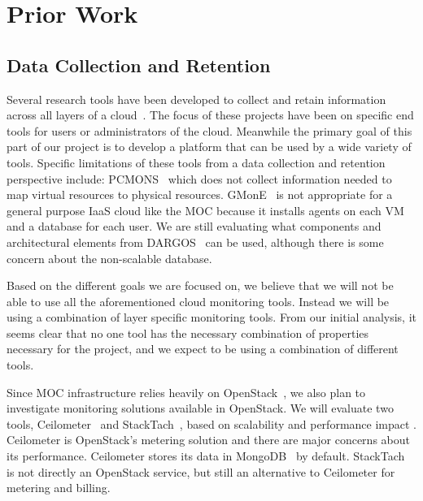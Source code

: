 

\section{Prior Work}
\label{sec:PriorWork}

%
\subsection{Data Collection and Retention}

Several research tools have been developed to collect and retain information across all layers of  a cloud~\cite{chaves2011toward,montes2013gmone,povedano2013dargos,alcaraz2015monpaas}.  The focus of these projects have been on specific end tools for users or administrators of the cloud. Meanwhile the primary goal of this part of our project is to develop a platform that can be used by a wide variety of tools. Specific limitations of these tools from a data collection and retention perspective include:  PCMONS~\cite{chaves2011toward}  which does not collect information needed to map virtual resources to physical resources. GMonE~\cite{montes2013gmone} is not appropriate for a general purpose IaaS cloud like the MOC because  it installs agents on each VM and a database for each user.  We are still evaluating what components and architectural elements from DARGOS~\cite{povedano2013dargos} can be used, although there is some concern about the non-scalable database. 

Based on the different goals we are focused on, we believe that we will not be able to use all the aforementioned cloud monitoring tools. Instead we will be using a combination of layer specific monitoring tools. From our initial analysis, it seems clear that no one tool has the necessary combination of properties necessary for the project, and we expect to be using a combination of different tools. 

Since MOC infrastructure relies heavily on OpenStack~\cite{sefraoui2012openstack}, we also plan to investigate monitoring solutions available in OpenStack. We will evaluate two tools, Ceilometer~\cite{ceilometer} and  StackTach~\cite{stacktach}, based on scalability and performance impact . Ceilometer is OpenStack’s metering solution and there are major concerns about its performance. Ceilometer stores its data in MongoDB~\cite{mongodb} by default. StackTach~\cite{stacktach} is not directly an OpenStack service, but still an alternative to Ceilometer for metering and billing.

